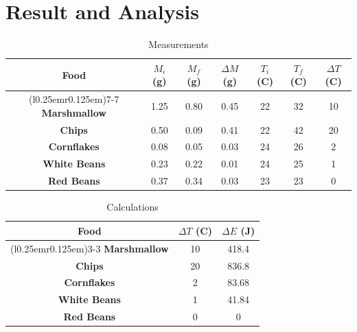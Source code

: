 \documentclass[a4paper, 12pt, english]{article}
\begin{document}
\section{Result and Analysis}
\begin{table}[H]
	\caption{\label{tab:Table 1} Measurements}
	\centering
	\begin{tabular}{c c c c c c c}
		\toprule
		\textbf{Food}              &
		\textbf{$M_i$ (g)}         &
		\textbf{$M_f$ (g)}         &
		\textbf{$\Delta M$ (g)}    &
		\textbf{$T_i$ (\degree C)} &
		\textbf{$T_f$ (\degree C)} &
		\textbf{$\Delta T$ (\degree C)}                                \\

		\cmidrule[0.4pt](r{0.125em}){1-1}%
		\cmidrule[0.4pt](lr{0.125em}){2-2}%
		\cmidrule[0.4pt](lr{0.125em}){3-3}%
		\cmidrule[0.4pt](lr{0.125em}){4-4}%
		\cmidrule[0.4pt](lr{0.125em}){5-5}%
		\cmidrule[0.4pt](lr{0.125em}){6-6}%
		\cmidrule[0.4pt](l{0.25em}r{0.125em}){7-7}%
		\textbf{Marshmallow}       & 1.25 & 0.80 & 0.45 & 22 & 32 & 10 \\
		\textbf{Chips}             & 0.50 & 0.09 & 0.41 & 22 & 42 & 20 \\
		\textbf{Cornflakes}        & 0.08 & 0.05 & 0.03 & 24 & 26 & 2  \\
		\textbf{White Beans}       & 0.23 & 0.22 & 0.01 & 24 & 25 & 1  \\
		\textbf{Red Beans}         & 0.37 & 0.34 & 0.03 & 23 & 23 & 0  \\
	\end{tabular}
\end{table}

\begin{table}[H]
	\caption{\label{tab:Table 2} Calculations}
	\centering
	\begin{tabular}{c c c}
		\toprule
		\textbf{Food}              &
		\textbf{$\Delta T$ (\degree C)} &
		\textbf{$\Delta E$ (J)} \\

		\cmidrule[0.4pt](r{0.125em}){1-1}%
		\cmidrule[0.4pt](lr{0.125em}){2-2}%
		\cmidrule[0.4pt](l{0.25em}r{0.125em}){3-3}%
		\textbf{Marshmallow}       & 10 & 418.4 \\
		\textbf{Chips}             & 20 & 836.8 \\
		\textbf{Cornflakes}        & 2  & 83.68 \\
		\textbf{White Beans}       & 1  & 41.84 \\
		\textbf{Red Beans}         & 0  & 0     \\
	\end{tabular}
\end{table}
\end{document}
